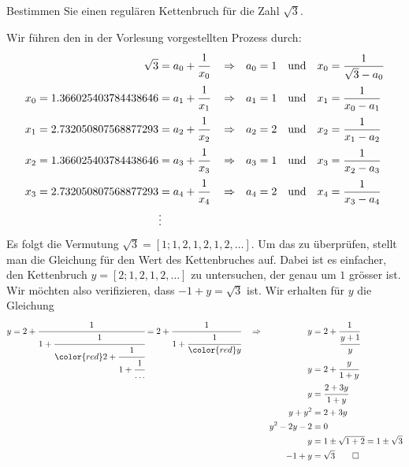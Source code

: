 Bestimmen Sie einen regulären Kettenbruch für die Zahl $\sqrt{3}$.


\begin{loesung}
Wir führen den in der Vorlesung vorgestellten Prozess durch:
\begin{align*}
\sqrt{3} &= a_0 + \cfrac{1}{x_0}
&&\Rightarrow &
a_0 &=1&&\text{und}&x_0&=\frac{1}{\sqrt{3}-a_0}
\\
x_0=1.366025403784438646&=a_1+\cfrac{1}{x_1}
&&\Rightarrow &
a_1 &=1&&\text{und}&x_1&=\frac{1}{x_0-a_1}
\\
x_1=2.732050807568877293&=a_2+\cfrac{1}{x_2}
&&\Rightarrow &
a_2 &=2&&\text{und}&x_2&=\frac{1}{x_1-a_2}
\\
x_2=1.366025403784438646&=a_3+\cfrac{1}{x_3}
&&\Rightarrow &
a_3 &=1&&\text{und}&x_3&=\frac{1}{x_2-a_3}
\\
x_3=2.732050807568877293&=a_4+\cfrac{1}{x_4}
&&\Rightarrow &
a_4 &=2&&\text{und}&x_4&=\frac{1}{x_3-a_4}
\\
&\vdots
\end{align*}
Es folgt die Vermutung $\sqrt{3} = [1;1,2,1,2,1,2,\dots]$.
Um das zu überprüfen, stellt man die Gleichung für den Wert des Kettenbruches
auf.
Dabei ist es einfacher, den Kettenbruch $y=[2;1,2,1,2,\dots]$ zu untersuchen,
der genau um $1$ grösser ist.
Wir möchten also verifizieren, dass $-1+y = \sqrt{3}$ ist.
Wir erhalten für $y$ die Gleichung 
\begin{align*}
y
&=
2 + \smash{\cfrac{1}{1+\cfrac{1}{{\color{red}2+\cfrac{1}{1+\cfrac{1}{\dots}}}}}}
=
2 + \cfrac{1}{1+\cfrac{1}{{\color{red}y}}}
&&\Rightarrow& y &=2+\cfrac{1}{\cfrac{y+1}{y}}
\\
&&&&
y&=2+\cfrac{y}{1+y}
\\
&&&&
y&=\cfrac{2+3y}{1+y}
\\
&&&&
y+y^2&=2+3y
\\
&&&&
y^2-2y-2&=0
\\
&&&&
y&=1\pm\sqrt{1+2}=1\pm\sqrt{3}
\\
&&&&
-1+y&=\sqrt{3}
\qedhere
\end{align*}
\end{loesung}
